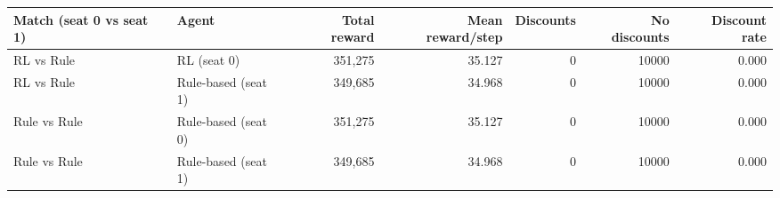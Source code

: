 \begin{tabular}{llrrrrr}
\toprule
Match (seat 0 vs seat 1) & Agent & Total reward & Mean reward/step & Discounts & No discounts & Discount rate \\
\midrule
RL vs Rule & RL (seat 0) & 351,275 & 35.127 & 0 & 10000 & 0.000 \\
RL vs Rule & Rule-based (seat 1) & 349,685 & 34.968 & 0 & 10000 & 0.000 \\
Rule vs Rule & Rule-based (seat 0) & 351,275 & 35.127 & 0 & 10000 & 0.000 \\
Rule vs Rule & Rule-based (seat 1) & 349,685 & 34.968 & 0 & 10000 & 0.000 \\
\bottomrule
\end{tabular}
